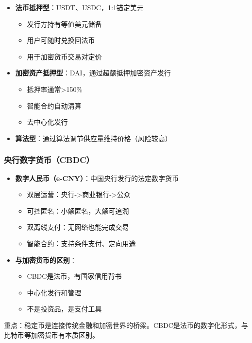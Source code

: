﻿\documentclass[12pt,a4paper]{article}
\begin{document}
\begin{itemize}[leftmargin=1.5em]
\item \textbf{法币抵押型}：USDT、USDC，1:1锚定美元
  \begin{itemize}
  \item 发行方持有等值美元储备
  \item 用户可随时兑换回法币
  \item 用于加密货币交易对定价
  \end{itemize}
\item \textbf{加密资产抵押型}：DAI，通过超额抵押加密资产发行
  \begin{itemize}
  \item 抵押率通常>150\%
  \item 智能合约自动清算
  \item 去中心化发行
  \end{itemize}
\item \textbf{算法型}：通过算法调节供应量维持价格（风险较高）
\end{itemize}

\subsubsection{央行数字货币（CBDC）}

\begin{itemize}[leftmargin=1.5em]
\item \textbf{数字人民币（e-CNY）}：中国央行发行的法定数字货币
  \begin{itemize}
  \item 双层运营：央行->商业银行->公众
  \item 可控匿名：小额匿名，大额可追溯
  \item 双离线支付：无网络也能完成交易
  \item 智能合约：支持条件支付、定向用途
  \end{itemize}
\item \textbf{与加密货币的区别}：
  \begin{itemize}
  \item CBDC是法币，有国家信用背书
  \item 中心化发行和管理
  \item 不是投资品，是支付工具
  \end{itemize}
\end{itemize}

\begin{keypointbox}
重点：稳定币是连接传统金融和加密世界的桥梁。CBDC是法币的数字化形式，与比特币等加密货币有本质区别。
\end{keypointbox}
\end{document}

